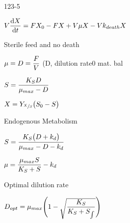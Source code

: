 \begin{mitframe}{123-5}
\begin{listone}
	\item $\vol\dfrac{\mathrm{d}X}{\mathrm{d}\timet}=\force{X}_{\init}-\force{X}+\vol\chempot{X}-\vol\thermcond_{death}X$
    	\begin{listtwo}
        	\item Sterile feed and no death
            	\begin{listthree}
                	\item $\chempot=\elecdisplace=\dfrac{\force}{\vol}$ (D, dilution rate0 mat. bal
                    \item $\entropy=\dfrac{\dilfac_{\entropy}\elecdisplace}{\chempot_{max}-\elecdisplace}$
                    \item $X=Y_{\sfrac{X}{\entropy}}\big(\entropy_{\init}-\entropy\big)$
                \end{listthree}
       	\item Endogenous Metabolism
       	\begin{listthree}
        	\item $\entropy=\dfrac{\dilfac_{\entropy}\big(\elecdisplace+\thermcond_d\big)}{\chempot_{max}-\elecdisplace-\thermcond_d}$
            	\begin{listfour}
                	\item $\chempot=\dfrac{\chempot_{max}\entropy}{\dilfac_{\entropy}+\entropy}-\thermcond_d$
                    
                \end{listfour}
        \end{listthree}
       	\item Optimal dilution rate
        	\begin{listthree}
            	\item $\elecdisplace_{opt}=\chempot_{max}\Bigg(1-\sqrt{\dfrac{\dilfac_{\entropy}}{\dilfac_{\entropy}+\entropy_{\int}}}\Bigg)$
            \end{listthree}
       \end{listtwo}
\end{listone}       
\end{mitframe}